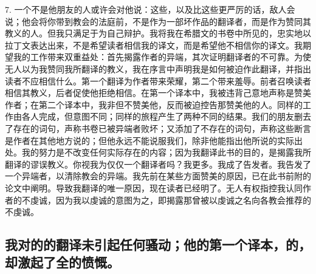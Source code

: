 7. 一个不是他朋友的人或许会对他说：这些，以及比这些更严厉的话，敌人会说；他会将你带到教会的法庭前，不是作为一部坏作品的翻译者，而是作为赞同其教义的人。但我只满足于为自己辩护。我将我在希腊文的书卷中所见的，忠实地以拉丁文表达出来，不是希望读者相信我的译文，而是希望他不相信你的译文。我期望我的工作带来双重益处：首先揭露作者的异端，其次证明翻译者的不可靠。为使无人以为我赞同我所翻译的教义，我在序言中声明我是如何被迫作此翻译，并指出读者不应相信什么。第一个翻译为作者带来荣耀，第二个带来羞辱。前者召唤读者相信其教义，后者促使他拒绝相信。在第一个译本中，我被违背己意地声称是赞美作者；在第二个译本中，我非但不赞美他，反而被迫控告那赞美他的人。同样的工作由各人完成，但意图不同；同样的旅程产生了两种不同的结果。我们的朋友删去了存在的词句，声称书卷已被异端者败坏；又添加了不存在的词句，声称这些断言是作者在其他地方说的；但他永远不能说服我们，除非他能指出他所说的实际出处。我的努力是不改变任何实际存在的内容；因为我翻译此书的目的，是揭露我所翻译的谬误教义。你视我为仅仅一个翻译者吗？我更多。我成了告发者。我告发了一个异端者，以清除教会的异端。我先前在某些方面赞美的原因，已在此书前附的论文中阐明。导致我翻译的唯一原因，现在读者已经明了。无人有权指控我认同作者的不虔诚，因为我以虔诚的意图为之，即揭露那曾被以虔诚之名向各教会推荐的不虔诚。\par


\subsection{我对的的翻译未引起任何骚动；他的第一个译本，的，却激起了全的愤慨。}

